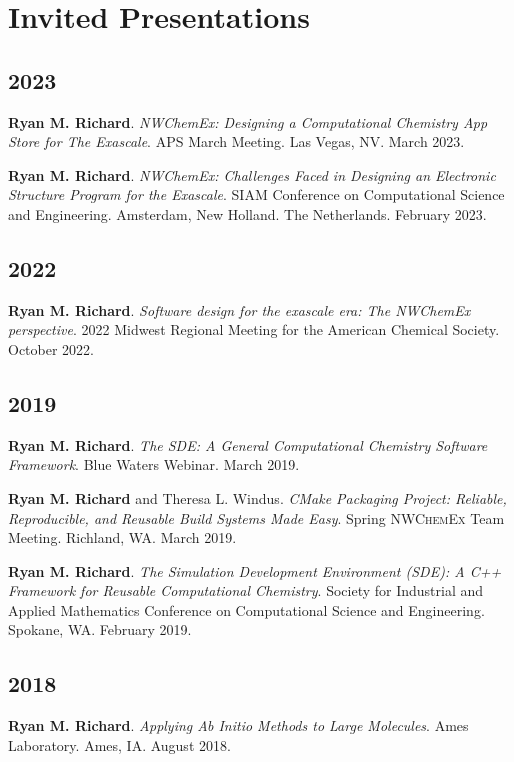 \documentclass[11pt,a4paper,sans]{moderncv}
\begin{document}
\section{Invited Presentations}
\vspace{5pt}
\begin{etaremune}
    \item[]{}
	\subsection{2023}
	\item{\textbf{Ryan M. Richard}. \textit{NWChemEx: Designing a Computational 
	      Chemistry App Store for The Exascale}. APS March Meeting. Las Vegas, 
		  NV. March 2023.}
	\item{\textbf{Ryan M. Richard}. \textit{NWChemEx: Challenges Faced in
	      Designing an Electronic Structure Program for the Exascale}. SIAM
		  Conference on Computational Science and Engineering. Amsterdam, New
		  Holland. The Netherlands. February 2023.}

	\subsection{2022}
    \item{\textbf{Ryan M. Richard}. \textit{Software design for the exascale 
	      era: The NWChemEx perspective}. 2022 Midwest Regional Meeting for the
		  American Chemical Society. October 2022.}

	\subsection{2019}
	\item{\textbf{Ryan M. Richard}. \textit{The SDE: A General Computational 
	      Chemistry Software Framework}. Blue Waters Webinar. March 2019.}
	\item{\textbf{Ryan M. Richard} and Theresa L. Windus. \textit{CMake 
	      Packaging Project: Reliable, Reproducible, and Reusable Build Systems 
		  Made Easy}. Spring \textsc{NWChemEx} Team Meeting. Richland, WA. 
		  March 2019.}
	\item{\textbf{Ryan M. Richard}. \textit{The Simulation Development 
	      Environment (SDE): A C++ Framework for Reusable Computational 
		  Chemistry}. Society for Industrial and Applied Mathematics Conference 
		  on Computational Science and Engineering. Spokane, WA. February 2019.}

	\subsection{2018}
	\item{\textbf{Ryan M. Richard}. \textit{Applying Ab Initio Methods to 
	      Large Molecules}. Ames Laboratory.  Ames, IA. August 2018.}


\end{etaremune}
\end{document}
